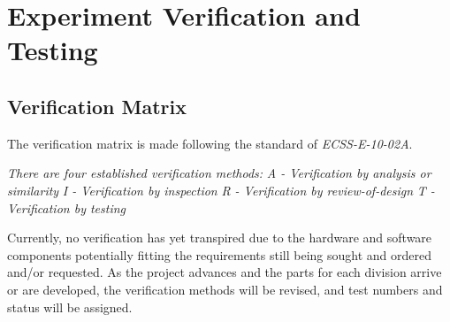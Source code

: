 \documentclass[a4paper,12pt,twoside]{article}
\begin{document}
\raggedbottom
\raggedbottom
\pagebreak
\section{Experiment Verification and Testing}

\subsection{Verification Matrix}

The verification matrix is made following the standard of \textit{ECSS-E-10-02A}. \cite{ECSSSecretariat}

\textit{There are four established verification methods:}
\newline \textit{A - Verification by analysis or similarity}
\newline \textit{I - Verification by inspection}
\newline \textit{R - Verification by review-of-design}
\newline \textit{T - Verification by testing}

Currently, no verification has yet transpired due to the hardware and software components potentially fitting the requirements still being sought and ordered and/or requested. As the project advances and the parts for each division arrive or are developed, the verification methods will be revised, and test numbers and status will be assigned.

\makeatletter
\renewcommand\@makefntext[1]{\leftskip=3em\hskip-1em\@makefnmark#1}
\makeatother
\end{document}
